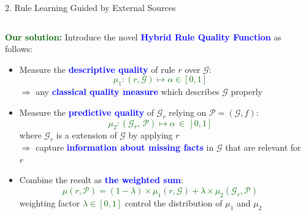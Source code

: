 \documentclass[t,final,hyperref={pdfpagelabels=true}]{beamer}
\def\cG{\ensuremath{\mathcal{G}}}
\newcommand{\red}[1]{\textcolor{darkred}{#1}}
\newcommand{\bl}[1]{\textcolor{blue}{#1}}
\newcommand{\gr}[1]{\textcolor{darkgreen}{#1}}
\newcommand{\mi}[1]{\ensuremath{\mathit{#1}}}
\begin{document}
\begin{frame}
\begin{columns}[t]
\begin{column}{.5\textwidth}
\begin{block}{2. Rule Learning Guided by External Sources}
\begin{columns}
\begin{column}{.45\textwidth}
					\end{column}
				\end{columns}
				\bigskip
				\bigskip
				\bigskip
				\begin{columns}
					\begin{column}{.9\textwidth}
						\small
						\gr{\textbf{Our solution:}} Introduce the novel \bl{\textbf{Hybrid Rule Quality Function} \pmb{$\mu$}} as follows:
						\begin{itemize}
							\bigskip
							\item Measure the \bl{\textbf{descriptive quality} } of rule $r$ over $\mathcal{G}$:
							      \gr{\[\mu_1: (r,\cG) \mapsto \alpha \in  [0,1]\]}
							      $\Rightarrow$ any \textbf{\bl{classical quality measure}} which describes $\cG$ properly
							      \bigskip
							      \bigskip
							      							
							\item Measure the \bl{\textbf{predictive quality} } of $\cG_r$ relying on $\mathcal{P}=(\cG,f)$:
							      \gr{\[\mu_2: (\cG_r{,}\, \mathcal{P}) \mapsto  \alpha \,{\in}\, [0,1]\]}
							      where $\mathcal{G}_r$ is a extension of $\mathcal{G}$ by applying $r$\\ $\Rightarrow$ capture \textbf{\bl{information about missing facts}} in $\cG$ that are relevant for $r$
							      \bigskip
							      \bigskip
							\item Combine the result as \bl{\textbf{the weighted sum}}:
							      \gr{\[\mu(r,\mathcal{P})= (1 - \lambda) \times \mu_1(r,\cG) + \lambda \times \mu_2(\cG_r,\mathcal{P})\]}
							      weighting factor \gr{$\lambda \in [0, 1]$} control the distribution of $\mu_1$ and $\mu_2$
						\end{itemize}
												
					\end{column}
					\begin{column}{0\textwidth}
					\end{column}
				\end{columns}	
												
				\bigskip
				\bigskip
				\bigskip							
								
								
								
								
								
			\end{block}
			\vspace{-2.55cm}
						

\end{column}
\end{columns}
\end{frame}
\end{document}
